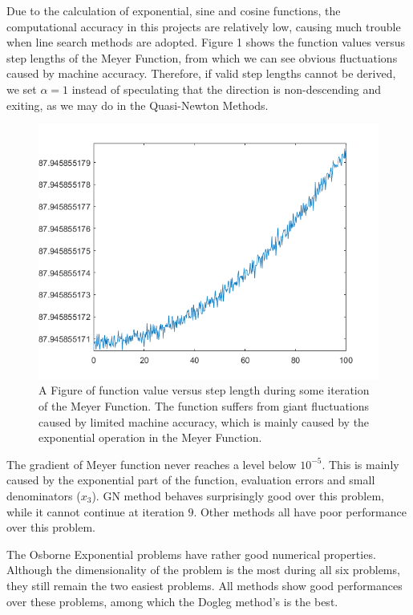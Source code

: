 \documentclass[11pt,a4paper]{article}
\begin{document}
Due to the calculation of exponential, sine and cosine functions, the computational accuracy in this projects are relatively low, causing much trouble when line search methods are adopted. Figure 1 shows the function values versus step lengths of the Meyer Function, from which we can see obvious fluctuations caused by machine accuracy. Therefore, if valid step lengths cannot be derived, we set $\alpha=1$ instead of speculating that the direction is non-descending and exiting, as we may do in the Quasi-Newton Methods.

\begin{figure}[ht]
\vskip 0.2in
\label{fig1}
\begin{center}
\centerline{\includegraphics[width=\columnwidth]{fig1}}
\caption{A Figure of function value versus step length during some iteration of the Meyer Function. The function suffers from giant fluctuations caused by limited machine accuracy, which is mainly caused by the exponential operation in the Meyer Function.}
\end{center}
\vskip -0.2in
\end{figure}

The gradient of Meyer function never reaches a level below $10^{-5}$. This is mainly caused by the exponential part of the function, evaluation errors and small denominators ($x_3$). GN method behaves surprisingly good over this problem, while it cannot continue at iteration $9$. Other methods all have poor performance over this problem.

The Osborne Exponential problems have rather good numerical properties. Although the dimensionality of the problem is the most during all six problems, they still remain the two easiest problems. All methods show good performances over these problems, among which the Dogleg method's is the best.
\end{document}

